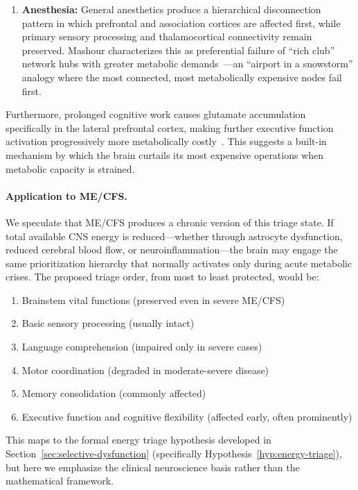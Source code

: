 \begin{speculation}
\begin{enumerate}
    \item \textbf{Anesthesia:} General anesthetics produce a hierarchical disconnection pattern in which prefrontal and association cortices are affected first, while primary sensory processing and thalamocortical connectivity remain preserved. Mashour characterizes this as preferential failure of ``rich club'' network hubs with greater metabolic demands~\cite{Mashour2024anesthesia}---an ``airport in a snowstorm'' analogy where the most connected, most metabolically expensive nodes fail first.
\end{enumerate}

Furthermore, prolonged cognitive work causes glutamate accumulation specifically in the lateral prefrontal cortex, making further executive function activation progressively more metabolically costly~\cite{Wiehler2022glutamate}. This suggests a built-in mechanism by which the brain curtails its most expensive operations when metabolic capacity is strained.

\paragraph{Application to ME/CFS.}
We speculate that ME/CFS produces a chronic version of this triage state. If total available CNS energy is reduced---whether through astrocyte dysfunction, reduced cerebral blood flow, or neuroinflammation---the brain may engage the same prioritization hierarchy that normally activates only during acute metabolic crises. The proposed triage order, from most to least protected, would be:

\begin{enumerate}
    \item Brainstem vital functions (preserved even in severe ME/CFS)
    \item Basic sensory processing (usually intact)
    \item Language comprehension (impaired only in severe cases)
    \item Motor coordination (degraded in moderate-severe disease)
    \item Memory consolidation (commonly affected)
    \item Executive function and cognitive flexibility (affected early, often prominently)
\end{enumerate}

This maps to the formal energy triage hypothesis developed in Section~\ref{sec:selective-dysfunction} (specifically Hypothesis~\ref{hyp:energy-triage}), but here we emphasize the clinical neuroscience basis rather than the mathematical framework.


\end{speculation}
